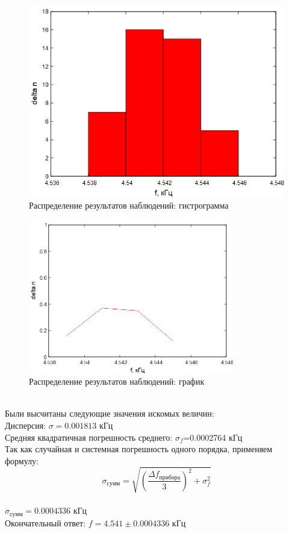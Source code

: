 \begin{figure}[H]
\centering
\includegraphics[width=1.0\textwidth]{gist}
\caption{Распределение результатов наблюдений: гистрограмма}
\label{fig:gist}
\end{figure}
\begin{figure}[H]
\centering
\includegraphics[width=0.8\textwidth]{graph3}
\caption{Распределение результатов наблюдений: график}
\label{fig:graph3}
\end{figure}\\
Были высчитаны следующие значения искомых величин:\\
Дисперсия: $\sigma=0.001813$ кГц\\
Средняя квадратичная погрешность среднего: $\sigma_f$=0.0002764 кГц\\
Так как случайная и системная погрешность одного порядка, применяем формулу:
\begin{equation}
    \sigma_{сумм}=\sqrt{(\frac{\Delta f_{прибора}}{3})^2+\sigma_f^2}
\end{equation}
\\
$\sigma_{сумм}=0.0004336$ кГц\\
Окончательный ответ: $f=4.541\pm0.0004336$ кГц\\
